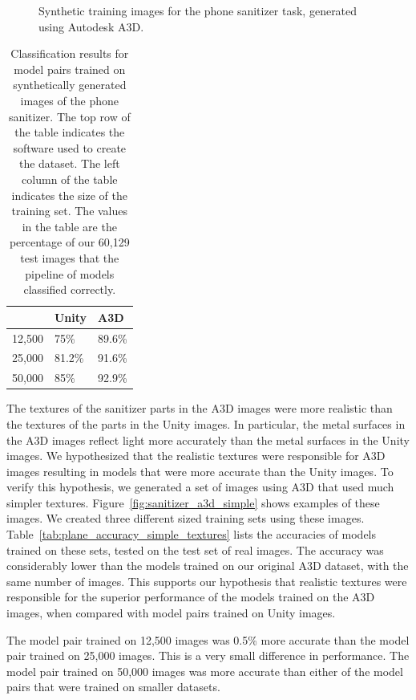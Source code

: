 \begin{figure}
  \caption{
    Synthetic training images for the phone sanitizer task, generated using
    Autodesk A3D.
  }\label{fig:sanitizer_a3d}
\end{figure}

\begin{table}
  \centering
\begin{tabular}{|l||l|l|}
  \hline
  & Unity & A3D\\
  \hline
  \hline
  12,500 & 75\% & 89.6\% \\
  \hline
  25,000 & 81.2\% & 91.6\%\\
  \hline
  50,000 & 85\% & 92.9\%\\
  \hline
\end{tabular}
  \caption{
    Classification results for model pairs trained on synthetically generated
    images of the phone sanitizer.
    The top row of the table indicates the software used to create the dataset.
    The left column of the table indicates the size of the training set.
    The values in the table are the percentage of our 60,129 test images that
    the pipeline of models classified correctly.
  }\label{tab:plane_accuracy}
\end{table}

The textures of the sanitizer parts in the A3D images were more realistic than
the textures of the parts in the Unity images.
In particular, the metal surfaces in the A3D images reflect light more
accurately than the metal surfaces in the Unity images.
We hypothesized that the realistic textures were responsible for A3D images
resulting in models that were more accurate than the Unity images.
To verify this hypothesis, we generated a set of images using A3D that used much
simpler textures.
Figure~\ref{fig:sanitizer_a3d_simple} shows examples of these images.
We created three different sized training sets using these images.
Table~\ref{tab:plane_accuracy_simple_textures} lists the accuracies of models
trained on these sets, tested on the test set of real images.
The accuracy was considerably lower than the models trained on our original A3D
dataset, with the same number of images.
This supports our hypothesis that realistic textures were responsible for
the superior performance of the models trained on the A3D images, when
compared with model pairs trained on Unity images.

The model pair trained on 12,500 images was 0.5\% more accurate than the model
pair trained on 25,000 images.
This is a very small difference in performance.
The model pair trained on 50,000 images was more accurate than either of the
model pairs that were trained on smaller datasets.

